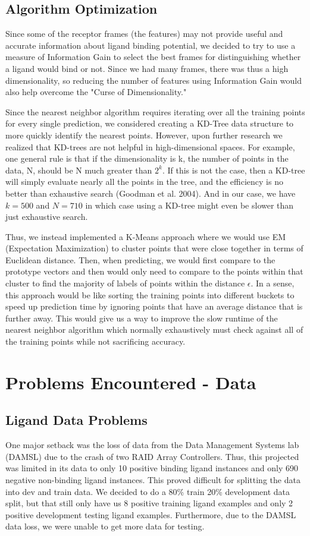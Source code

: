 \documentclass[11pt,letterpaper]{article}
\begin{document}
\subsection{Algorithm Optimization}
Since some of the receptor frames (the features) may not provide useful and accurate information about ligand binding potential, we decided to try to use a measure of Information Gain to select the best frames for distinguishing whether a ligand would bind or not.  Since we had many frames, there was thus a high dimensionality, so reducing the number of features using Information Gain would also help overcome the "Curse of Dimensionality."  

Since the nearest neighbor algorithm requires iterating over all the training points for every single prediction, we considered creating a KD-Tree data structure to more quickly identify the nearest points.  However, upon further research we realized that KD-trees are not helpful in high-dimensional spaces.  For example, one general rule is that if the dimensionality is k, the number of points in the data, N, should be N much greater than $2^k$. If this is not the case, then a KD-tree will simply evaluate nearly all the points in the tree, and the efficiency is no better than exhaustive search (Goodman et al. 2004).  And in our case, we have $k=500$ and $N=710$ in which case using a KD-tree might even be slower than just exhaustive search.

Thus, we instead implemented a K-Means approach where we would use EM (Expectation Maximization) to cluster points that were close together in terms of Euclidean distance.  Then, when predicting, we would first compare to the prototype vectors and then would only need to compare to the points within that cluster to find the majority of labels of points within the distance $\epsilon$.  In a sense, this approach would be like sorting the training points into different buckets to speed up prediction time by ignoring points that have an average distance that is further away.  This would give us a way to improve the slow runtime of the nearest neighbor algorithm which normally exhaustively must check against all of the training points while not sacrificing accuracy.

\section{Problems Encountered - Data}
\subsection{Ligand Data Problems}
One major setback was the loss of data from the Data Management Systems lab (DAMSL) due to the crash of two RAID Array Controllers.  Thus, this projected was limited in its data to only 10 positive binding ligand instances and only 690 negative non-binding ligand instances.  This proved difficult for splitting the data into dev and train data.  We decided to do a 80\% train 20\% development data split, but that still only have us 8 positive training ligand examples and only 2 positive development testing ligand examples.  Furthermore, due to the DAMSL data loss, we were unable to get more data for testing.  
\end{document}
